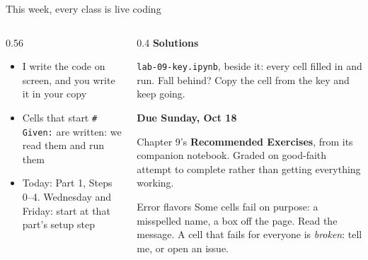 \documentclass[9pt,aspectratio=169]{beamer}
\begin{document}
\begin{frame}{This week, every class is live coding}
\begin{columns}[T]
\begin{column}{0.56\textwidth}
            \medskip
            \begin{itemize}\small
                \item I write the code on screen, and you write it in your copy
                \item Cells that start \texttt{\# Given:} are written: we read them and run them
                \item Today: Part 1, Steps 0--4. Wednesday and Friday: start at that part's setup step
            \end{itemize}
        \end{column}
        \begin{column}{0.4\textwidth}
            \textbf{Solutions}\\[2pt]
            {\footnotesize \texttt{lab-09-key.ipynb}, beside it: every cell filled in and run. Fall behind? Copy the cell from the key and keep going.\par}
            \medskip
            \textbf{Due Sunday, Oct 18}\\[2pt]
            {\footnotesize Chapter 9's \textbf{Recommended Exercises}, from its companion notebook. Graded on good-faith attempt to complete rather than getting everything working.\par}
            \medskip
            \begin{alertblock}{Error flavors}
                \footnotesize Some cells fail on purpose: a misspelled name, a box off the page. Read the message. A cell that fails for everyone is \textit{broken}: tell me, or open an issue.
            \end{alertblock}
        \end{column}
    \end{columns}
\end{frame}
\end{document}

